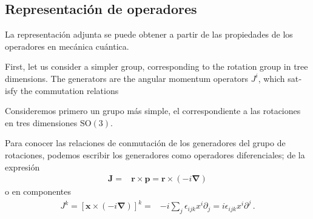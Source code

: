 \begin{subappendices}
  
\subsection{Representación  de operadores}
La representación adjunta se puede obtener a partir de las propiedades de los operadores en mecánica cuántica.

\begin{english}
First, let us consider a simpler group, corresponding to the rotation group in tree dimensions. The generators are the angular momentum operators $J^i$, which satisfy the commutation relations
\end{english}
\begin{spanish}
Consideremos primero un grupo más simple, el correspondiente a las rotaciones en tres dimensiones $\operatorname{SO(3)}$. 
\end{spanish}
Para conocer las relaciones de conmutación de los generadores del grupo de rotaciones, podemos escribir los generadores como operadores diferenciales; de la expresión 
\begin{align}
  \mathbf{J}=&\mathbf{r}\times \mathbf{p}=\mathbf{r}\times (-i\boldsymbol{\nabla})
\end{align}
o en componentes
\begin{align}
\label{eq:rxpi}
  J^k=\left[\mathbf{x}\times (-i\boldsymbol{\nabla})\right]^k=&
-i\sum_j\epsilon_{ijk}x^i\partial_j=i\epsilon_{ijk}x^i\partial^j\,.
\end{align}


\end{subappendices}
